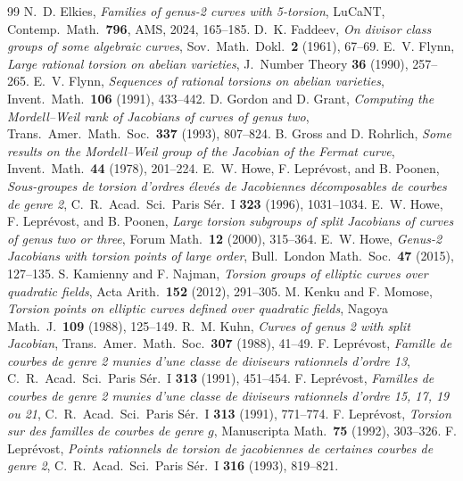 \documentclass[10pt]{amsart}
\begin{document}
\begin{thebibliography}{99}
 N.~D. Elkies, \emph{Families of genus-2 curves with 5-torsion}, LuCaNT, Contemp.\ Math.\ \textbf{796}, AMS, 2024, 165--185.
 D.~K. Faddeev, \emph{On divisor class groups of some algebraic curves}, Sov.\ Math.\ Dokl.\ \textbf{2} (1961), 67--69.
 E.~V. Flynn, \emph{Large rational torsion on abelian varieties}, J.~Number Theory \textbf{36} (1990), 257--265.
 E.~V. Flynn, \emph{Sequences of rational torsions on abelian varieties}, Invent.\ Math.\ \textbf{106} (1991), 433--442.
 D. Gordon and D. Grant, \emph{Computing the Mordell--Weil rank of Jacobians of curves of genus two}, Trans.\ Amer.\ Math.\ Soc.\ \textbf{337} (1993), 807--824.
 B. Gross and D. Rohrlich, \emph{Some results on the Mordell--Weil group of the Jacobian of the Fermat curve}, Invent.\ Math.\ \textbf{44} (1978), 201--224.
 E.~W. Howe, F. Lepr\'evost, and B. Poonen, \emph{Sous-groupes de torsion d'ordres \'elev\'es de Jacobiennes d\'ecomposables de courbes de genre 2}, C.~R.\ Acad.\ Sci.\ Paris S\'er.\ I \textbf{323} (1996), 1031--1034.
 E.~W. Howe, F. Lepr\'evost, and B. Poonen, \emph{Large torsion subgroups of split Jacobians of curves of genus two or three}, Forum Math.\ \textbf{12} (2000), 315--364.
 E.~W. Howe, \emph{Genus-2 Jacobians with torsion points of large order}, Bull.\ London Math.\ Soc.\ \textbf{47} (2015), 127--135.
 S. Kamienny and F. Najman, \emph{Torsion groups of elliptic curves over quadratic fields}, Acta Arith.\ \textbf{152} (2012), 291--305.
 M. Kenku and F. Momose, \emph{Torsion points on elliptic curves defined over quadratic fields}, Nagoya Math.\ J.\ \textbf{109} (1988), 125--149.
 R.~M. Kuhn, \emph{Curves of genus 2 with split Jacobian}, Trans.\ Amer.\ Math.\ Soc.\ \textbf{307} (1988), 41--49.
 F. Lepr\'evost, \emph{Famille de courbes de genre 2 munies d'une classe de diviseurs rationnels d'ordre 13}, C.~R.\ Acad.\ Sci.\ Paris S\'er.\ I \textbf{313} (1991), 451--454.
 F. Lepr\'evost, \emph{Familles de courbes de genre 2 munies d'une classe de diviseurs rationnels d'ordre 15, 17, 19 ou 21}, C.~R.\ Acad.\ Sci.\ Paris S\'er.\ I \textbf{313} (1991), 771--774.
 F. Lepr\'evost, \emph{Torsion sur des familles de courbes de genre $g$}, Manuscripta Math.\ \textbf{75} (1992), 303--326.
 F. Lepr\'evost, \emph{Points rationnels de torsion de jacobiennes de certaines courbes de genre 2}, C.~R.\ Acad.\ Sci.\ Paris S\'er.\ I \textbf{316} (1993), 819--821.

\end{thebibliography}
\end{document}
